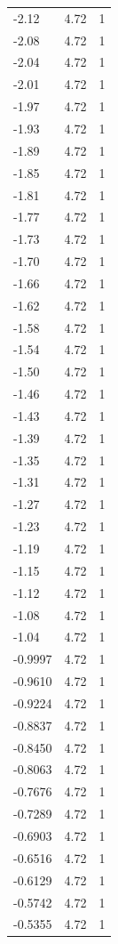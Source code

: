 \begin{longtable}{lrr}
  -2.12 & 4.72 & 1 \\
  -2.08 & 4.72 & 1 \\
  -2.04 & 4.72 & 1 \\
  -2.01 & 4.72 & 1 \\
  -1.97 & 4.72 & 1 \\
  -1.93 & 4.72 & 1 \\
  -1.89 & 4.72 & 1 \\
  -1.85 & 4.72 & 1 \\
  -1.81 & 4.72 & 1 \\
  -1.77 & 4.72 & 1 \\
  -1.73 & 4.72 & 1 \\
  -1.70 & 4.72 & 1 \\
  -1.66 & 4.72 & 1 \\
  -1.62 & 4.72 & 1 \\
  -1.58 & 4.72 & 1 \\
  -1.54 & 4.72 & 1 \\
  -1.50 & 4.72 & 1 \\
  -1.46 & 4.72 & 1 \\
  -1.43 & 4.72 & 1 \\
  -1.39 & 4.72 & 1 \\
  -1.35 & 4.72 & 1 \\
  -1.31 & 4.72 & 1 \\
  -1.27 & 4.72 & 1 \\
  -1.23 & 4.72 & 1 \\
  -1.19 & 4.72 & 1 \\
  -1.15 & 4.72 & 1 \\
  -1.12 & 4.72 & 1 \\
  -1.08 & 4.72 & 1 \\
  -1.04 & 4.72 & 1 \\
  -0.9997 & 4.72 & 1 \\
  -0.9610 & 4.72 & 1 \\
  -0.9224 & 4.72 & 1 \\
  -0.8837 & 4.72 & 1 \\
  -0.8450 & 4.72 & 1 \\
  -0.8063 & 4.72 & 1 \\
  -0.7676 & 4.72 & 1 \\
  -0.7289 & 4.72 & 1 \\
  -0.6903 & 4.72 & 1 \\
  -0.6516 & 4.72 & 1 \\
  -0.6129 & 4.72 & 1 \\
  -0.5742 & 4.72 & 1 \\
  -0.5355 & 4.72 & 1 \\

\end{longtable}
